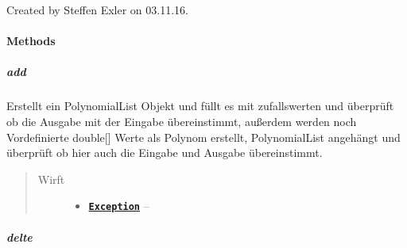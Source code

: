 \documentclass[letterpaper,10pt,ngerman]{sphinxmanual}
\begin{document}
\begin{fulllineitems}
\label{com/linuxluigi/polynomial/test/PolynomialListTest:com.linuxluigi.polynomial.test.PolynomialListTest}
Created by Steffen Exler on 03.11.16.

\end{fulllineitems}



\paragraph{Methods}
\label{com/linuxluigi/polynomial/test/PolynomialListTest:methods}

\subparagraph{add}
\label{com/linuxluigi/polynomial/test/PolynomialListTest:add}

\begin{fulllineitems}
\label{com/linuxluigi/polynomial/test/PolynomialListTest:com.linuxluigi.polynomial.test.PolynomialListTest.add()}
Erstellt ein PolynomialList Objekt und füllt es mit zufallswerten und überprüft ob die Ausgabe mit der Eingabe übereinstimmt, außerdem werden noch Vordefinierte double{[}{]} Werte als Polynom erstellt, PolynomialList angehängt und überprüft ob hier auch die Eingabe und Ausgabe übereinstimmt.
\begin{quote}\begin{description}
\item[{Wirft}] \leavevmode\begin{itemize}
\item {} 
\href{http://docs.oracle.com/javase/8/docs/api/java/lang/Exception.html}{\textbf{\texttt{Exception}}} -- 

\end{itemize}

\end{description}\end{quote}

\end{fulllineitems}



\subparagraph{delte}
\label{com/linuxluigi/polynomial/test/PolynomialListTest:delte}
\end{document}
